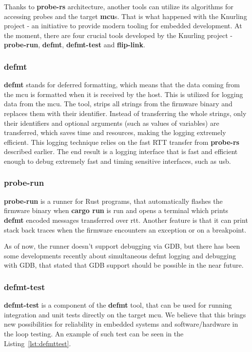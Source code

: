 Thanks to \textbf{probe-rs} architecture, another tools can utilize its algorithms for accessing probes and the target \textbf{mcu}s.
That is what happened with the Knurling project - an initiative to provide modern tooling for embedded development.
At the moment, there are four crucial tools developed by the Knurling project - \textbf{probe-run}, \textbf{defmt}, \textbf{defmt-test} and \textbf{flip-link}.

\subsubsection{defmt}
\textbf{defmt} stands for deferred formatting\cite{knurling_project_knurling-rsdefmt_2021}, which means that the data coming from the \acs{mcu} is formatted when it is received by the host.
This is utilized for logging data from the \acs{mcu}.
The tool, strips all strings from the firmware binary and replaces them with their identifier.
Instead of transferring the whole strings, only their identifiers and optional arguments (such as values of variables) are transferred, which saves time and resources, making the logging extremely efficient.
This logging technique relies on the fast RTT transfer from \textbf{probe-rs} described earlier.
The end result is a logging interface that is fast and efficient enough to debug extremely fast and timing sensitive interfaces, such as \acs{usb}.

\subsubsection{probe-run}
\textbf{probe-run} is a runner for Rust programs\cite{knurling_project_knurling-rsprobe-run_2021}, that automatically flashes the firmware binary when \textbf{cargo run} is run and opens a terminal which prints \textbf{defmt} encoded messages transferred over \acs{rtt}.
Another feature is that it can print stack back traces when the firmware encounters an exception or on a breakpoint.

As of now, the runner doesn't support debugging via GDB, but there has been some developments recently about simultaneous defmt logging and debugging with GDB, that stated that GDB support should be possible in the near future\cite{aparicio_using_nodate}.

\subsubsection{defmt-test}
\label{subsubsec:defmttest}
\textbf{defmt-test} is a component of the \textbf{defmt} tool, that can be used for running integration and unit tests directly on the target \acs{mcu}.
We believe that this brings new possibilities for reliability in embedded systems and software/hardware in the loop testing.
An example of such test can be seen in the Listing~\ref{lst:defmttest}.

